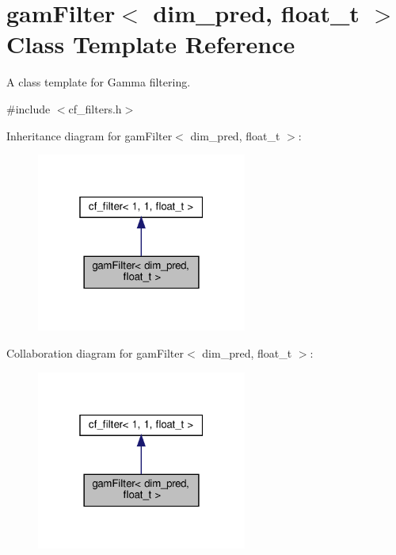 \hypertarget{classgamFilter}{}\section{gam\+Filter$<$ dim\+\_\+pred, float\+\_\+t $>$ Class Template Reference}
\label{classgamFilter}


A class template for Gamma filtering.  




{\ttfamily \#include $<$cf\+\_\+filters.\+h$>$}



Inheritance diagram for gam\+Filter$<$ dim\+\_\+pred, float\+\_\+t $>$\+:
\nopagebreak
\begin{figure}[H]
\begin{center}
\leavevmode
\includegraphics[width=196pt]{classgamFilter__inherit__graph}
\end{center}
\end{figure}


Collaboration diagram for gam\+Filter$<$ dim\+\_\+pred, float\+\_\+t $>$\+:
\nopagebreak
\begin{figure}[H]
\begin{center}
\leavevmode
\includegraphics[width=196pt]{classgamFilter__coll__graph}
\end{center}
\end{figure}
